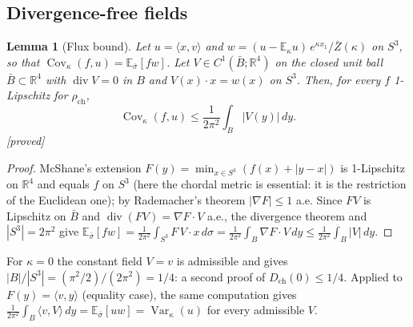 \documentclass[11pt,a4paper]{article}
\newtheorem{lemma}[theorem]{Lemma}
\theoremstyle{remark}
\theoremstyle{definition}
\newcommand{\R}{\mathbb{R}}
\newcommand{\E}{\mathbb{E}}
\newcommand{\Cov}{\operatorname{Cov}}
\newcommand{\Var}{\operatorname{Var}}
\newcommand{\st}[1]{\textsf{[#1]}}
\newcommand{\Zb}{\bar Z}
\newcommand{\Dch}{D_{\mathrm{ch}}}
\newcommand{\rch}{\rho_{\mathrm{ch}}}
\begin{document}
\subsection{Divergence-free fields}\label{sec:chfield}

\begin{lemma}[Flux bound]\label{lem:flux}
Let $u=\langle x,v\rangle$ and $w=(u-\E_\kappa u)\,e^{\kappa x_1}/\Zb(\kappa)$ on $S^3$, so that
$\Cov_\kappa(f,u)=\E_{\bar\sigma}[fw]$. Let $V\in C^1(\bar B;\R^4)$ on the closed unit ball $\bar B\subset\R^4$ with
$\operatorname{div}V=0$ in $B$ and $V(x)\cdot x=w(x)$ on $S^3$. Then, for every $f$ 1-Lipschitz for $\rch$,
\[
\Cov_\kappa(f,u)\le\frac1{2\pi^2}\int_B|V(y)|\,dy .
\]
\st{proved}
\end{lemma}
\begin{proof}
McShane's extension $F(y)=\min_{x\in S^3}(f(x)+|y-x|)$ is 1-Lipschitz on $\R^4$ and equals $f$ on $S^3$ (here the
chordal metric is essential: it is the restriction of the Euclidean one); by Rademacher's theorem
$|\nabla F|\le1$ a.e. Since $FV$ is Lipschitz on $\bar B$ and $\operatorname{div}(FV)=\nabla F\cdot V$ a.e., the
divergence theorem and $|S^3|=2\pi^2$ give
$\E_{\bar\sigma}[fw]=\frac1{2\pi^2}\int_{S^3}F\,V\cdot x\,d\sigma=\frac1{2\pi^2}\int_B\nabla F\cdot V\,dy
\le\frac1{2\pi^2}\int_B|V|\,dy$.
\end{proof}
For $\kappa=0$ the constant field $V=v$ is admissible and gives $|B|/|S^3|=(\pi^2/2)/(2\pi^2)=1/4$: a second proof
of $\Dch(0)\le1/4$. Applied to $F(y)=\langle v,y\rangle$ (equality case), the same computation gives
$\frac1{2\pi^2}\int_B\langle v,V\rangle\,dy=\E_{\bar\sigma}[uw]=\Var_\kappa(u)$ for every admissible $V$.
\end{document}
